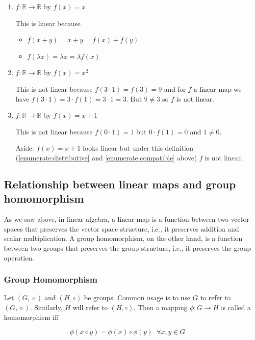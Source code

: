 \documentclass{article}
\theoremstyle{definition}
\begin{document}
\begin{enumerate}
\item $f: \mathbb{R} \rightarrow \mathbb{R}$ by $f(x) = x$

\medskip
This is linear because 
\begin{itemize}
\item $f(x+y) = x + y = f(x) + f(y)$  
\item $f(\lambda x) = \lambda x = \lambda f(x)$	
\end{itemize}

\medskip
\item $f: \mathbb{R} \rightarrow \mathbb{R}$ by $f(x) = x^2$

\medskip
This is not linear because $f(3\cdot 1) = f(3) = 9$ and
for $f$ a linear map we have $f(3 \cdot 1) = 3 \cdot 
f(1) = 3 \cdot 1 = 3$. But $9 \neq 3$ so $f$ is not linear.

\medskip
\item $f: \mathbb{R} \rightarrow \mathbb{R}$ by $f(x) = x+1$

\medskip
This is not linear because $f(0 \cdot 1) = 1$ but 
$0\cdot f(1) = 0$ and $1 \neq 0$.

\smallskip
\noindent
Aside: $f(x) = x+1$ looks linear but under this definition
(\ref{enumerate:distributive} and \ref{enumerate:compatible}
above) $f$ is not linear.
\end{enumerate}

\subsection{Relationship between linear maps and group homomorphism}
As we saw above, in linear algebra, a linear map is a function
between two vector spaces that preserves the vector space
structure, i.e., it preserves addition and scalar
multiplication. A group homomorphism, on the other hand, is a
function between two groups that preserves the group structure,
i.e., it preserves the group operation.


\subsubsection{Group Homomorphism}
Let $(G,\diamond)$ and $(H, \circ)$ be groups. Common usage is to
use $G$ to refer to $(G,\diamond)$. Similarly, $H$ will refer to
$(H, \circ)$. Then a mapping $\phi: G \rightarrow H$ is called a
homomorphism iff

\medskip
\begin{equation*}
\phi(x \diamond y) = \phi(x) \circ \phi(y) \;\; \forall x,y \in G
\end{equation*}
\end{document}

